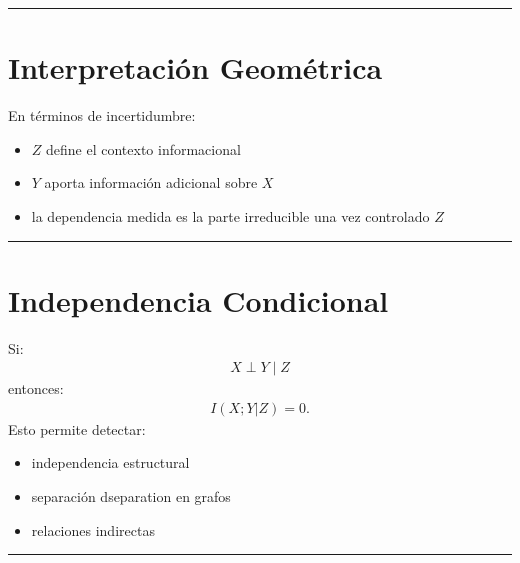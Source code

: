 \documentclass[letterpaper,10pt,english]{jupyterBook}
\begin{document}
\bigskip\hrule\bigskip



\section{Interpretación Geométrica}
\label{\detokenize{03_multivariate_models/conditional_mi:interpretacion-geometrica}}
\sphinxAtStartPar
En términos de incertidumbre:
\begin{itemize}
\item {} 
\sphinxAtStartPar
\(Z\) define el contexto informacional

\item {} 
\sphinxAtStartPar
\(Y\) aporta información adicional sobre \(X\)

\item {} 
\sphinxAtStartPar
la dependencia medida es la parte irreducible
una vez controlado \(Z\)

\end{itemize}


\bigskip\hrule\bigskip



\section{Independencia Condicional}
\label{\detokenize{03_multivariate_models/conditional_mi:independencia-condicional}}
\sphinxAtStartPar
Si:
\begin{equation*}
\begin{split}
X \perp Y \mid Z
\end{split}
\end{equation*}
\sphinxAtStartPar
entonces:
\begin{equation*}
\begin{split}
I(X;Y|Z)=0.
\end{split}
\end{equation*}
\sphinxAtStartPar
Esto permite detectar:
\begin{itemize}
\item {} 
\sphinxAtStartPar
independencia estructural

\item {} 
\sphinxAtStartPar
separación d\sphinxhyphen{}separation en grafos

\item {} 
\sphinxAtStartPar
relaciones indirectas

\end{itemize}


\bigskip\hrule\bigskip
\end{document}
